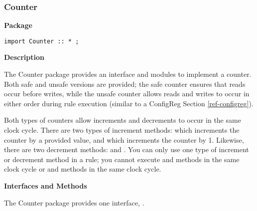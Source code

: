 \subsubsection{Counter}
\label{sec-Counter}


{\bf Package}

\begin{verbatim}
import Counter :: * ;
\end{verbatim}




{\bf Description}

The Counter package provides an interface and  modules to
implement a counter.   Both  safe and unsafe versions are provided;
the safe counter ensures that reads occur before writes, while the unsafe counter
allows reads and writes to occur in either order during rule execution
(similar to a ConfigReg Section \ref{ref-configreg}).

Both types of counters allow increments and decrements to occur in the same
clock cycle.  There are two types of increment methods: 
which increments the counter by a provided value, and  which
increments the counter by 1.  Likewise, there are two decrement
methods:  and .  You can only use one type of
increment or decrement method in a rule; you cannot execute   and
   methods in the same clock cycle or
  and  methods in the same clock cycle.  





{\bf Interfaces and Methods}

The Counter package provides one interface, .

